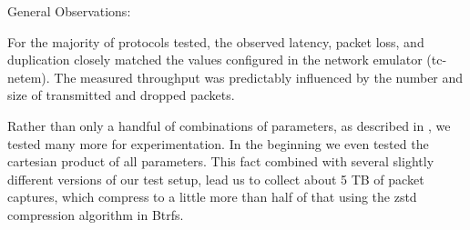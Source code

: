 


General Observations:

For the majority of protocols tested, the observed latency, packet loss, and duplication closely matched the values configured in the network emulator (tc-netem).
The measured throughput was predictably influenced by the number and size of transmitted and dropped packets.



Rather than only a handful of combinations of parameters, as described in , we tested many more for experimentation.
In the beginning we even tested the cartesian product of all parameters.
This fact combined with several slightly different versions of our test setup, lead us to collect about 5 TB of packet captures, which compress to a little more than half of that using the zstd compression algorithm in Btrfs.


